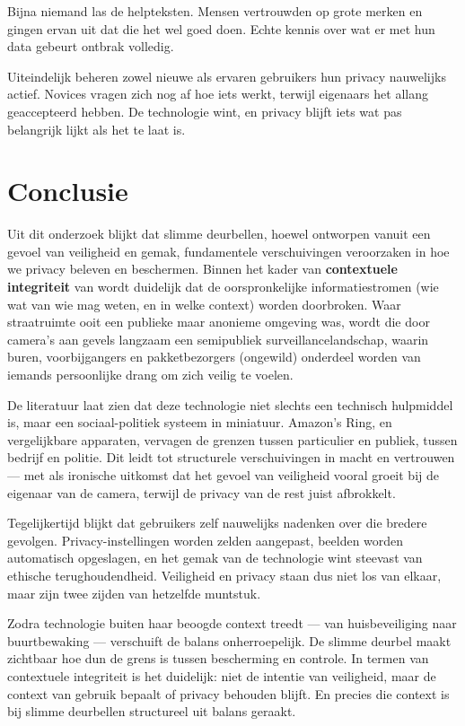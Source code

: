 \documentclass[nonacm, sigconf]{acmart}
\begin{document}
    Bijna niemand las de helpteksten.
    Mensen vertrouwden op grote merken en gingen ervan uit dat die het wel goed doen.
    Echte kennis over wat er met hun data gebeurt ontbrak volledig.

    Uiteindelijk beheren zowel nieuwe als ervaren gebruikers hun privacy nauwelijks actief.
    Novices vragen zich nog af hoe iets werkt, terwijl eigenaars het allang geaccepteerd hebben.
    De technologie wint, en privacy blijft iets wat pas belangrijk lijkt als het te laat is.


    \section{Conclusie}
    Uit dit onderzoek blijkt dat slimme deurbellen, hoewel ontworpen vanuit een gevoel van veiligheid en gemak, fundamentele verschuivingen veroorzaken in hoe we privacy beleven en beschermen.
    Binnen het kader van \textbf{contextuele integriteit} van \citeauthor{nissenbaum2009privacy} wordt duidelijk dat de oorspronkelijke informatiestromen (wie wat van wie mag weten, en in welke context) worden doorbroken.
    Waar straatruimte ooit een publieke maar anonieme omgeving was, wordt die door camera's aan gevels langzaam een semipubliek surveillancelandschap, waarin buren, voorbijgangers en pakketbezorgers (ongewild) onderdeel worden van iemands persoonlijke drang om zich veilig te voelen.

    De literatuur laat zien dat deze technologie niet slechts een technisch hulpmiddel is, maar een sociaal-politiek systeem in miniatuur.
    Amazon’s Ring, en vergelijkbare apparaten, vervagen de grenzen tussen particulier en publiek, tussen bedrijf en politie.
    Dit leidt tot structurele verschuivingen in macht en vertrouwen — met als ironische uitkomst dat het gevoel van veiligheid vooral groeit bij de eigenaar van de camera, terwijl de privacy van de rest juist afbrokkelt.

    Tegelijkertijd blijkt dat gebruikers zelf nauwelijks nadenken over die bredere gevolgen.
    Privacy-instellingen worden zelden aangepast, beelden worden automatisch opgeslagen, en het gemak van de technologie wint steevast van ethische terughoudendheid.
    Veiligheid en privacy staan dus niet los van elkaar, maar zijn twee zijden van hetzelfde muntstuk.

    Zodra technologie buiten haar beoogde context treedt — van huisbeveiliging naar buurtbewaking — verschuift de balans onherroepelijk.
    De slimme deurbel maakt zichtbaar hoe dun de grens is tussen bescherming en controle.
    In termen van contextuele integriteit is het duidelijk: niet de intentie van veiligheid, maar de context van gebruik bepaalt of privacy behouden blijft.
    En precies die context is bij slimme deurbellen structureel uit balans geraakt.

    \printbibliography

    \balance %
\end{document}
